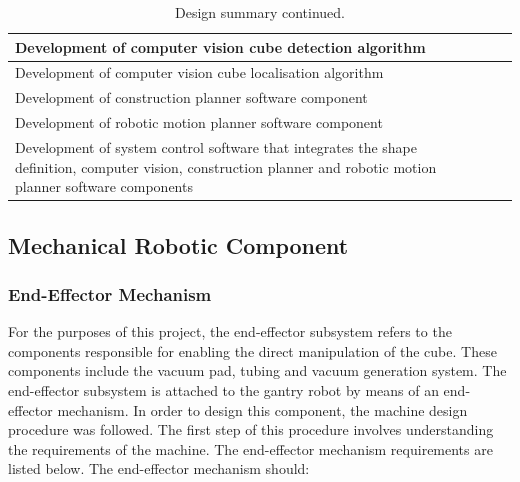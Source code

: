 \begin{table}[h]
	\renewcommand{\arraystretch}{1.3}
	\centering
	\begin{tabular}{|>{\raggedright}m{5cm}|>{\raggedright}m{4cm}|>{\raggedright\arraybackslash}m{4cm}|}
		\hline
		Development of computer vision cube detection algorithm & & \\
		\hline
		Development of computer vision cube localisation algorithm & & \\
		\hline
		Development of construction planner software component & & \\
		\hline
		Development of robotic motion planner software component & & \\
		\hline
		Development of system control software that integrates the shape definition, computer vision, construction planner and robotic motion planner software components & & \\
		\hline
	\end{tabular}
	\caption{\label{tab:design_summary_p2}Design summary continued.}
\end{table}

\subsection{Mechanical Robotic Component}

\subsubsection{End-Effector Mechanism}

For the purposes of this project, the end-effector subsystem refers to the components responsible for enabling the direct manipulation of the cube. These components include the vacuum pad, tubing and vacuum generation system. The end-effector subsystem is attached to the gantry robot by means of an end-effector mechanism. In order to design this component, the machine design procedure was followed. The first step of this procedure involves understanding the requirements of the machine. The end-effector mechanism requirements are listed below. The end-effector mechanism should:

